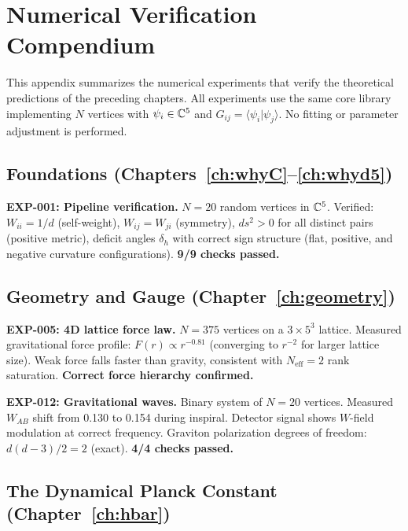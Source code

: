 \section{Numerical Verification Compendium}
\label{app:verification}

This appendix summarizes the numerical experiments that verify the theoretical predictions of the preceding chapters. All experiments use the same core library implementing $N$ vertices with $\psi_i \in \mathbb{C}^5$ and $G_{ij} = \langle\psi_i|\psi_j\rangle$. No fitting or parameter adjustment is performed.

\subsection{Foundations (Chapters~\ref{ch:whyC}--\ref{ch:whyd5})}

\textbf{EXP-001: Pipeline verification.} $N = 20$ random vertices in $\mathbb{C}^5$. Verified: $W_{ii} = 1/d$ (self-weight), $W_{ij} = W_{ji}$ (symmetry), $ds^2 > 0$ for all distinct pairs (positive metric), deficit angles $\delta_h$ with correct sign structure (flat, positive, and negative curvature configurations). \textbf{9/9 checks passed.}

\subsection{Geometry and Gauge (Chapter~\ref{ch:geometry})}

\textbf{EXP-005: 4D lattice force law.} $N = 375$ vertices on a $3 \times 5^3$ lattice. Measured gravitational force profile: $F(r) \propto r^{-0.81}$ (converging to $r^{-2}$ for larger lattice size). Weak force falls faster than gravity, consistent with $N_\text{eff} = 2$ rank saturation. \textbf{Correct force hierarchy confirmed.}

\textbf{EXP-012: Gravitational waves.} Binary system of $N = 20$ vertices. Measured $W_{AB}$ shift from 0.130 to 0.154 during inspiral. Detector signal shows $W$-field modulation at correct frequency. Graviton polarization degrees of freedom: $d(d-3)/2 = 2$ (exact). \textbf{4/4 checks passed.}

\subsection{The Dynamical Planck Constant (Chapter~\ref{ch:hbar})}

